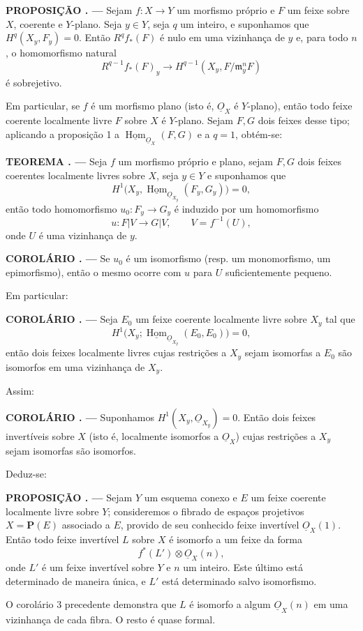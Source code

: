 \documentclass[11pt,twoside,openany]{book}
\numberwithin{equation}{section}
\newcommand{\src}[1]{%
  \phantomsection\hypertarget{src:#1}{}%
  \marginpar{\raggedleft\footnotesize\sffamily #1}%
}
\newcommand{\Osh}{\underline{O}}
\newcommand{\Homsh}{\underline{\operatorname{Hom}}}
\theoremstyle{plain}
\theoremstyle{definition}
\theoremstyle{remark}
\newcommand{\result}[2]{%
  \par\medskip\noindent\textbf{#1%
  \if\relax\detokenize{#2}\relax\else\space#2\fi. ---}\enspace
}
\newcommand{\FgaUnitKey}{frontmatter}
\renewcommand{\src}[1]{%
  \phantomsection\hypertarget{src:\FgaUnitKey:#1}{}%
  \marginpar{\raggedleft\footnotesize\sffamily #1}%
}
\begin{document}
\src{201}
\result{PROPOSIÇÃO}{1} Sejam $f:X\longrightarrow Y$ um morfismo próprio e $F$
um feixe sobre $X$, coerente e $Y$-plano. Seja $y\in Y$, seja $q$ um inteiro, e
suponhamos que $H^q(X_y,F_y)=0$. Então $R^qf_*(F)$ é nulo em uma vizinhança de
$y$ e, para todo $n$, o homomorfismo natural
\[
  R^{q-1}f_*(F)_y\longrightarrow
  H^{q-1}(X_y,F/\mathfrak m_y^nF)
\]
é sobrejetivo.

Em particular, se $f$ é um morfismo plano (isto é, $\Osh_X$ é $Y$-plano),
então todo feixe coerente localmente livre $F$ sobre $X$ é $Y$-plano. Sejam
$F,G$ dois feixes desse tipo; aplicando a proposição 1 a
$\Homsh_{\Osh_X}(F,G)$ e a $q=1$, obtém-se:

\result{TEOREMA}{7} Seja $f$ um morfismo próprio e plano, sejam $F,G$ dois feixes
coerentes localmente livres sobre $X$, seja $y\in Y$ e suponhamos que
\[
  H^1\bigl(X_y,\Homsh_{\Osh_{X_y}}(F_y,G_y)\bigr)=0,
\]
então todo homomorfismo $u_0:F_y\longrightarrow G_y$ é induzido por um
homomorfismo
\[
  u:F|V\longrightarrow G|V,
  \qquad V=f^{-1}(U),
\]
onde $U$ é uma vizinhança de $y$.

\result{COROLÁRIO}{} Se $u_0$ é um isomorfismo (resp. um monomorfismo, um
epimorfismo), então o mesmo ocorre com $u$ para $U$ suficientemente
pequeno.

Em particular:

\src{202}
\result{COROLÁRIO}{2} Seja $E_0$ um feixe coerente localmente livre sobre $X_y$
tal que
\[
  H^1\bigl(X_y;\Homsh_{\Osh_{X_y}}(E_0,E_0)\bigr)=0,
\]
então dois feixes localmente livres cujas restrições a $X_y$ sejam isomorfas
a $E_0$ são isomorfos em uma vizinhança de $X_y$.

Assim:

\result{COROLÁRIO}{3} Suponhamos $H^1(X_y,\Osh_{X_y})=0$. Então dois feixes
invertíveis sobre $X$ (isto é, localmente isomorfos a $\Osh_X$) cujas
restrições a $X_y$ sejam isomorfas são isomorfos.

Deduz-se:

\result{PROPOSIÇÃO}{2} Sejam $Y$ um esquema conexo e $E$ um feixe coerente localmente livre sobre $Y$; consideremos o fibrado de espaços projetivos
$X=\mathbf P(E)$ associado a $E$, provido de seu conhecido feixe invertível
$\Osh_X(1)$. Então todo feixe invertível $L$ sobre $X$ é isomorfo a um feixe da
forma
\[
  f^*(L')\otimes\Osh_X(n),
\]
onde $L'$ é um feixe invertível sobre $Y$ e $n$ um inteiro. Este último está
determinado de maneira única, e $L'$ está determinado salvo isomorfismo.

O corolário 3 precedente demonstra que $L$ é isomorfo a algum $\Osh_X(n)$ em
uma vizinhança de cada fibra. O resto é quase formal.
\end{document}
